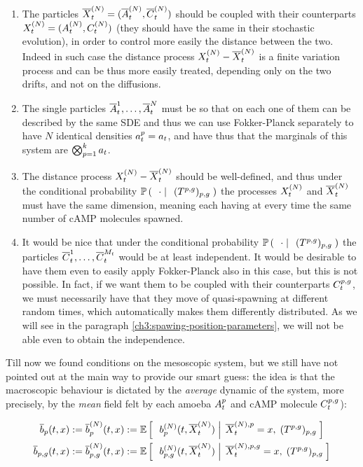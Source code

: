 \begin{enumerate}
	\item The particles $\overline{X}_t^{(N)} = (\overline{A}_t^{(N)}, \overline{C}_t^{(N)})$ should be coupled with their counterparts $X_t^{(N)} = (A_t^{(N)}, C_t^{(N)})$ (\ie they should have the same \Bm in their stochastic evolution), in order to control more easily the distance between the two.
	Indeed in such case the distance process $X_t^{(N)} -\overline{X}_t^{(N)}$ is a finite variation process and can be thus more easily treated, depending only on the two drifts, and not on the diffusions.
	\item The single particles $\overline{A}_t^1, \ldots, \overline{A}_t^N$ must be \iid so that on each one of them can be described by the same SDE and thus we can use Fokker-Planck separately to have $N$ identical densities $a_t^p = a_t$, and have thus that the marginals of this system are $\bigotimes_{p=1}^{k}a_t$.	
	\item The distance process $X_t^{(N)} -\overline{X}_t^{(N)}$ should be well-defined, and thus under the conditional probability $\mathbb{P} \left( \; \left. \; \cdot \; \right| \; \;(T^{p,g})_{p,g}  \; \right)$ the processes $X_t^{(N)}$ and $\overline{X}_t^{(N)}$ must have the same dimension, meaning each having at every time the same number of cAMP molecules spawned.	
	\item It would be nice that under the conditional probability $\mathbb{P} \left( \; \left. \; \cdot \; \right| \; \;(T^{p,g})_{p,g}  \; \right)$ the particles $\overline{C}_t^1, \ldots, \overline{C}_t^{M_t}$ would be at least independent.
	It would be desirable to have them even \iid to easily apply Fokker-Planck also in this case, but this is not possible.
	In fact, if we want them to be coupled with their counterparts $C_t^{p,g}$, we must necessarily have that they move of quasi-\Bm spawning at different random times, which automatically makes them differently distributed.
	As we will see in the paragraph \ref{ch3:spawing-position-parameters}, we will not be able even to obtain the independence.
\end{enumerate}

Till now we found conditions on the mesoscopic system, but we still have not pointed out at the main way to provide our smart guess: the idea is that the macroscopic behaviour is dictated by the \emph{average} dynamic of the system, more precisely, by the \emph{mean} field felt by each amoeba $A_t^p$ and cAMP molecule $C_t^{p,g}$):

\begin{align*}
	\overline{b}_p(t, x) := \overline{b}_p^{(N)}(t, x) &:= \mathbb{E} \left[ \; \left. \; b_p^{(N)}(t, \overline{X}_t^{(N)} )  \; \right| \; \overline{X}_t^{(N),p} = x, \;(T^{p,g})_{p,g} \; \right]
	\\
	\overline{b}_{p,g}(t, x) := \overline{b}_{p,g}^{(N)}(t, x) &:= \mathbb{E} \left[ \; \left. \; b_{p,g}^{(N)}(t, \overline{X}_t^{(N)} )  \; \right| \; \overline{X}_t^{(N),p,g} = x, \;(T^{p,g})_{p,g} \; \right]
\end{align*}

